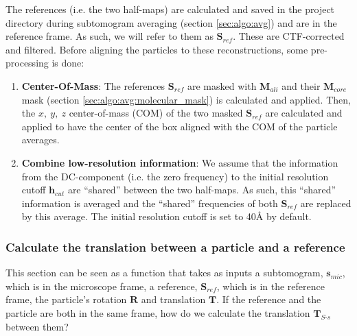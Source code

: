 The references (i.e. the two half-maps) are calculated and saved in the project directory during subtomogram averaging (section \ref{sec:algo:avg}) and are in the reference frame. As such, we will refer to them as $\bm{S}_{ref}$. These are CTF-corrected and filtered. Before aligning the particles to these reconstructions, some pre-processing is done:
\begin{enumerate}
    \item \textbf{Center-Of-Mass}: The references $\bm{S}_{ref}$ are masked with $\bm{M}_{ali}$ and their $\bm{M}_{core}$ mask (section \ref{sec:algo:avg:molecular_mask}) is calculated and applied. Then, the $x,\ y,\ z$ center-of-mass (COM) of the two masked $\bm{S}_{ref}$ are calculated and applied to have the center of the box aligned with the COM of the particle averages.

    \item \textbf{Combine low-resolution information}: We assume that the information from the DC-component (i.e. the zero frequency) to the initial resolution cutoff $\bm{h}_{cut}$ are ``shared'' between the two half-maps. As such, this ``shared'' information is averaged and the ``shared'' frequencies of both $\bm{S}_{ref}$ are replaced by this average. The initial resolution cutoff is set to 40\si{\angstrom} by default.
\end{enumerate}

\subsubsection{Calculate the translation between a particle and a reference} \label{sec:algo:align:get_translation}

This section can be seen as a function that takes as inputs a subtomogram, $\bm{s}_{mic}$, which is in the microscope frame, a reference, $\bm{S}_{ref}$, which is in the reference frame, the particle's rotation $\bm{R}$ and translation $\bm{T}$. If the reference and the particle are both in the same frame, how do we calculate the translation $\bm{T}_{S\text{-}s}$ between them?

